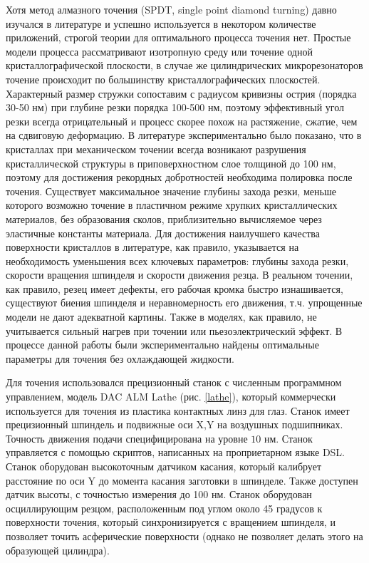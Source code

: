 Хотя метод алмазного точения (SPDT, single point diamond turning) давно изучался в литературе и успешно используется в некотором количестве приложений, строгой теории для оптимального процесса точения нет. Простые модели процесса рассматривают изотропную среду или точение одной кристаллографической плоскости, в случае же цилиндрических микрорезонаторов точение происходит по большинству кристаллографических плоскостей. Характерный размер стружки сопоставим с радиусом кривизны острия (порядка 30-50 нм) при глубине резки порядка 100-500 нм, поэтому эффективный угол резки всегда отрицательный и процесс скорее похож на растяжение, сжатие, чем на сдвиговую деформацию. В литературе экспериментально было показано, что в кристаллах при механическом точении всегда возникают разрушения кристаллической структуры в приповерхностном слое толщиной до 100 нм, поэтому для достижения рекордных добротностей необходима полировка после точения. Существует максимальное значение глубины захода резки, меньше которого возможно точение в пластичном режиме хрупких кристаллических материалов, без образования сколов, приблизительно вычисляемое через эластичные константы материала. Для достижения наилучшего качества поверхности кристаллов в литературе, как правило, указывается на необходимость уменьшения всех ключевых параметров: глубины захода резки, скорости вращения шпинделя и скорости движения резца. В реальном точении, как правило, резец имеет дефекты, его рабочая кромка быстро изнашивается, существуют биения шпинделя и неравномерность его движения, т.ч. упрощенные модели не дают адекватной картины. Также в моделях, как правило, не учитывается сильный нагрев при точении или пьезоэлектрический эффект. В процессе данной работы были экспериментально найдены оптимальные параметры для точения без охлаждающей жидкости.

Для точения использовался прецизионный станок с численным программном управлением, модель DAC ALM Lathe (рис. \ref{lathe}), который коммерчески используется для точения из пластика контактных линз для глаз. Станок имеет прецизионный шпиндель и подвижные оси X,Y на воздушных подшипниках. Точность движения подачи специфицирована на уровне $10$ нм. Станок управляется с помощью скриптов, написанных на проприетарном языке DSL. Станок оборудован высокоточным датчиком касания, который калибрует расстояние по оси Y до момента касания заготовки в шпинделе. Также доступен датчик высоты, с точностью измерения до 100 нм. Станок оборудован осциллирующим резцом, расположенным под углом около 45 градусов к поверхности точения, который синхронизируется с вращением шпинделя, и позволяет точить асферические поверхности (однако не позволяет делать этого на образующей цилиндра).

